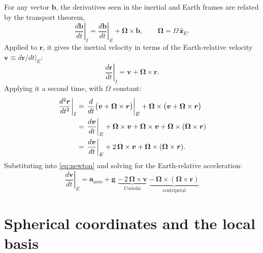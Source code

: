 \documentclass[11pt]{report}
\numberwithin{equation}{chapter}
\newcommand{\zh}{\hat{\mathbf z}_E}
\newcommand{\vb}[1]{\bm{#1}}
\begin{document}
For any vector $\vb b$, the derivatives seen in the inertial and Earth frames are related
by the transport theorem,
\begin{equation}
  \left.\frac{d\vb b}{dt}\right|_I = \left.\frac{d\vb b}{dt}\right|_E + \vb\Omega\times\vb b,
  \qquad \vb\Omega = \Omega\,\zh .
\end{equation}
Applied to $\vb r$, it gives the inertial velocity in terms of the Earth-relative
velocity $\vb v \equiv \left.d\vb r/dt\right|_E$:
\begin{equation}
  \left.\frac{d\vb r}{dt}\right|_I = \vb v + \vb\Omega\times\vb r .
\end{equation}
Applying it a second time, with $\Omega$ constant:
\begin{align}
  \left.\frac{d^2\vb r}{dt^2}\right|_I
  &= \left.\frac{d}{dt}\big(\vb v + \vb\Omega\times\vb r\big)\right|_E
     + \vb\Omega\times\big(\vb v + \vb\Omega\times\vb r\big) \notag\\
  &= \left.\frac{d\vb v}{dt}\right|_E + \vb\Omega\times\vb v
     + \vb\Omega\times\vb v + \vb\Omega\times(\vb\Omega\times\vb r) \notag\\
  &= \left.\frac{d\vb v}{dt}\right|_E + 2\,\vb\Omega\times\vb v
     + \vb\Omega\times(\vb\Omega\times\vb r).
\end{align}
Substituting into \cref{eq:newton} and solving for the Earth-relative acceleration:
\begin{equation}
  \boxed{\;
  \left.\frac{d\vb v}{dt}\right|_E
  = \vb a_{\text{aero}} + \vb g
    \;\underbrace{-\,2\,\vb\Omega\times\vb v}_{\text{Coriolis}}
    \;\underbrace{-\,\vb\Omega\times(\vb\Omega\times\vb r)}_{\text{centripetal}} \;}
  \label{eq:rotating}
\end{equation}

\section{Spherical coordinates and the local basis}
\end{document}
